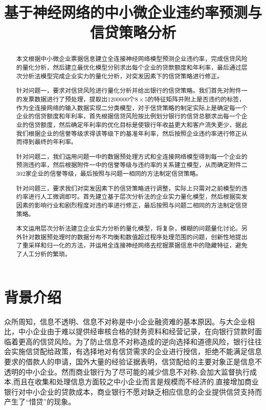 \documentclass{cumcmthesis}
\title{基于神经网络的中小微企业违约率预测与信贷策略分析}
\begin{document}
 \maketitle
 \begin{abstract}
    本文根据中小微企业票据信息建立全连接神经网络模型预测企业违约率，完成信贷风险的量化分析，然后建立最优化模型分别求出每个企业的贷款额度和年利率，最后通过层次分析法模型完成企业实力的量化分析，对突发因素下的信贷策略进行修正。
    
    针对问题一，要求对信贷风险进行量化分析并给出银行的信贷策略。我们首先对附件一的发票数据进行了预处理，提取出1200000个$8 \times 5$的特征矩阵并附上是否违约的标签，作为全连接网络的输入数据实现二分类模型，对于信贷策略的制定实际上是确定每一个企业的信贷额度和年利率，首先根据信贷风险按比例划分银行的信贷总额求出每一个企业的信贷额度，然后确定年利率的优化目标是使银行年收益更大和客户流失更少，据此我们根据企业的信誉等级求得该等级下的基准年利率，然后按照企业违约率进行修正从而得到最终的年利率。
    
    针对问题二，我们运用问题一中的数据预处理方式和全连接网络模型得到每一个企业的预测违约率，然后根据附件一中的信誉等级与违约率的关系建立模型，从而确定附件二302家企业的信誉等级，最后按照与问题一相同的方法制定信贷策略。
    
    针对问题三，要求我们对突发因素下的信贷策略进行调整，实际上只需对之前模型的违约率进行人工微调即可。首先建立基于层次分析法的企业实力量化模型，然后根据突发因素的影响行业和剧烈程度对违约率进行修正，最后按照与问题二相同的方法制定信贷策略。
    
    本文运用层次分析法建立企业实力分析的量化模型，将复杂，模糊的问题量化讨论。另外针对数据预处理时的数据分布不均衡和数值超过程序处理范围的问题，创新性地提出了重采样和归一化的方法，并运用全连接神经网络去挖掘票据信息中的隐藏特征，避免了人工分析的繁琐。
    

\end{abstract}



\section{背景介绍}

众所周知，信息不透明、信息不对称是中小企业融资难的基本原因。与大企业相比，中小企业由于难以提供经审核合格的财务资料和经营记录，在向银行贷款时面临着更高的信贷风险。为了防止信息不对称造成的逆向选择和道德风险，银行往往会实施信贷配给政策，有选择地对有信贷需求的企业进行授信，拒绝不能满足信息要求的借款人的申请，国外大量的经验证据表明，信贷配给的主要对象正是信息不透明的中小企业。然而商业银行为了尽可能的减少信息不对称,会加大监督执行成本,而且在收集和处理信息方面较之中小企业而言是规模而不经济的,直接增加商业银行对中小企业的贷款成本，商业银行不愿对缺乏相应信息的企业提供信贷支持而产生了“惜贷”的现象。
\end{document}
